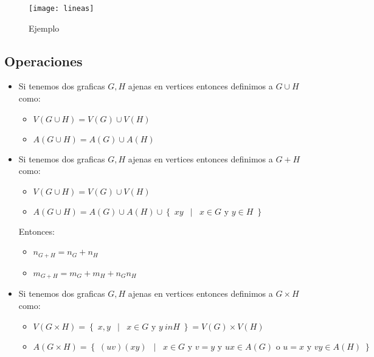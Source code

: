 \documentclass[12pt, fleqn]{report}                             %
\DeclareMathOperator \Space     {\quad}                         %
\DeclareMathOperator \MiniSpace {\;}                            %
\newcommand \Such           {\MiniSpace | \MiniSpace}           %
\theoremstyle{break}                                            %
\newcommand{\Set}[1]            {\left\{ \; #1 \; \right\}}     %
\begin{document}
                \begin{figure}[h]
                    \centering
                    \texttt{[image: lineas]}
                    \caption{Ejemplo}
                \end{figure}

            \subsection{Operaciones}

                \begin{itemize}
                    \item 
                        Si tenemos dos graficas $G, H$ ajenas en vertices entonces definimos a $G \cup H$ como:
                        \begin{itemize}
                            \item $V(G \cup H) = V(G) \cup V(H)$
                            \item $A(G \cup H) = A(G) \cup A(H)$
                        \end{itemize}

                    \item 
                        Si tenemos dos graficas $G, H$ ajenas en vertices entonces definimos a $G + H$ como:
                        \begin{itemize}
                            \item $V(G \cup H) = V(G) \cup V(H)$
                            \item $A(G \cup H) = A(G) \cup A(H) \cup \Set{xy \Such x \in G \text{ y } y \in H}$
                        \end{itemize}

                        Entonces:
                        \begin{itemize}
                            \item $n_{G+H} = n_G + n_H$
                            \item $m_{G+H} = m_G + m_H + n_G n_H$
                        \end{itemize}

                    \item 
                        Si tenemos dos graficas $G, H$ ajenas en vertices entonces definimos a $G \times H$ como:
                        \begin{itemize}
                            \item $V(G \times H) = \Set{x, y \Such x \in G \text{ y } y \ in H} = V(G) \times V(H)$
                            \item $A(G \times H) = \Set{(uv)(xy) \Such x \in G \text{ y } 
                                v = y \text{ y } ux \in A(G) 
                                \text{ o }
                                u = x \text{ y } vy \in A(H) 
                                }$
                        \end{itemize}


\end{itemize}
\end{document}
